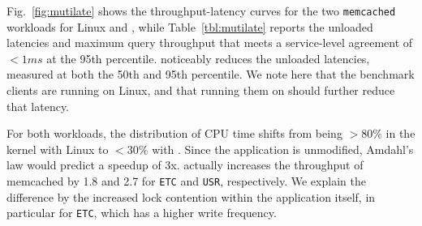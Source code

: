 


 Fig.~\ref{fig:mutilate} shows the throughput-latency curves for the
two \texttt{memcached} workloads for Linux and \ix, while
Table~\ref{tbl:mutilate} reports the unloaded latencies and maximum query throughput that meets a service-level agreement of $<1ms$ at the 95th percentile.
\ix noticeably reduces the unloaded latencies, measured
at both the 50th and 95th percentile.  We note here that the benchmark
clients are running on Linux, and that running them on \ix should
further reduce that latency. 

For both workloads, the distribution of CPU time shifts from being
$>80\%$ in the kernel with Linux to $<30\%$ with \ix.  Since the
application is unmodified, Amdahl's law would predict a speedup of 3x.
\ix actually increases the throughput of memcached by 1.8 and 2.7
for \texttt{ETC} and \texttt{USR}, respectively.  We explain the
difference by the increased lock contention within the application
itself, in particular for \texttt{ETC}, which has a higher write frequency.


%

